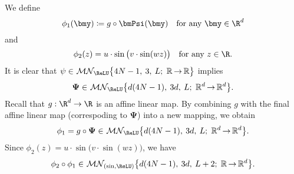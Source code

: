 \documentclass[11pt,a4paper]{article}
\begin{document}
We define 
\begin{equation*}
    \phi_1(\bmy)\coloneqq  g\circ \bmPsi(\bmy)\quad \tn{for any $\bmy\in \R^d$}
\end{equation*}
and
\begin{equation*}
    \phi_2(z) = u \cdot \sin\big(v \cdot \sin(wz)\big)
    \quad \tn{for any $z\in \R$.}
\end{equation*}
It is clear that 
\(\psi \in \mn[\big]{\ReLU}{4N-1}{3}{L}{\mathbb{R}}{\mathbb{R}}\)
implies
\[{\bm{\Psi}} \in \mn[\big]{\ReLU}{d(4N-1)}{3d}{L}{\mathbb{R}^d}{\mathbb{R}^d}.\]
Recall that \( g:\R^d\to\R\) is an affine linear map. 
By combining \(g\) with the final affine linear map (correspoding to \(\bm{\Psi}\)) into a new mapping, we obtain
\[\phi_1 =  g \circ {\bm{\Psi}} \in \mn[\big]{\ReLU}{d(4N-1)}{3d}{L}{\mathbb{R}^d}{\mathbb{R}^d}.\]
Since $\phi_2(z) = u \cdot \sin\big(v \cdot \sin(wz)\big)$, we have
\[ \phi_2\circ\phi_1  \in \mn[\big]{(\sin,\ReLU)}{d(4N-1)}{3d}{L+2}{\mathbb{R}}{\mathbb{R}^d}.\]
\end{document}

